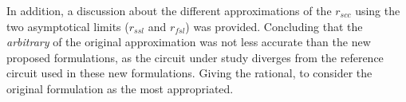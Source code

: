 In addition, a discussion about the different approximations of the $r_{scc}$ using the two asymptotical limits ($r_{ssl}$ and $r_{fsl}$) was provided. Concluding that the \emph{arbitrary} of the original approximation was not less accurate than the new proposed formulations, as the circuit under study diverges from the reference circuit used in these new formulations. Giving the rational, to consider the original formulation as the most appropriated. 
  
 

\clearpage

 